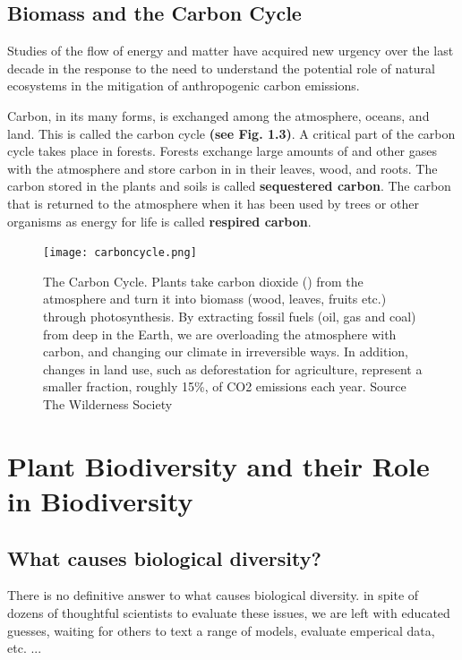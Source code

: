 \subsection{Biomass and the Carbon Cycle}

Studies of the flow of energy and matter have acquired new urgency over the last decade in the response to the need to understand the potential role of natural ecosystems in the mitigation of anthropogenic carbon emissions.

   Carbon, in its many forms, is exchanged among the atmosphere, oceans, and land. This is called the carbon cycle \textbf{(see Fig. 1.3)}. A critical part of the carbon cycle takes place in forests. Forests exchange large amounts of  and other gases with the atmosphere and store carbon in in their leaves, wood, and roots. The carbon stored in the plants and soils is called \textbf{sequestered carbon}. The carbon that is returned to the atmosphere when it has been used by trees or other organisms as energy for life is called \textbf{respired carbon}. 
  
    \begin{figure}[ht]
    \centering
        \texttt{[image: carboncycle.png]}
        \caption{The Carbon Cycle. Plants take carbon dioxide (\CO) from the atmosphere and turn it into biomass (wood, leaves, fruits etc.) through photosynthesis. By extracting fossil fuels (oil, gas and coal) from deep in the Earth, we are overloading the atmosphere with carbon, and changing our climate in irreversible ways. In addition, changes in land use, such as deforestation for agriculture, represent a smaller fraction, roughly 15\%, of CO2 emissions each year. Source The Wilderness Society}
    \end{figure}

\section{Plant Biodiversity and their Role in Biodiversity}

\subsection{What causes biological diversity?}

There is no definitive answer to what causes biological diversity. in spite of dozens of thoughtful scientists to evaluate these issues, we are left with educated guesses, waiting for others to text a range of models, evaluate emperical data, etc. ...

